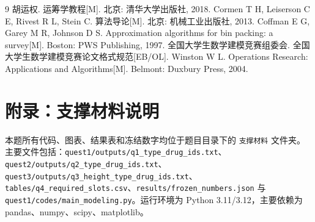 \documentclass[UTF8,a4paper,12pt]{ctexart}
\begin{document}
\begin{thebibliography}{9}
 胡运权. 运筹学教程[M]. 北京: 清华大学出版社, 2018.
 Cormen T H, Leiserson C E, Rivest R L, Stein C. 算法导论[M]. 北京: 机械工业出版社, 2013.
 Coffman E G, Garey M R, Johnson D S. Approximation algorithms for bin packing: a survey[M]. Boston: PWS Publishing, 1997.
 全国大学生数学建模竞赛组委会. 全国大学生数学建模竞赛论文格式规范[EB/OL].
 Winston W L. Operations Research: Applications and Algorithms[M]. Belmont: Duxbury Press, 2004.
\end{thebibliography}

\appendix
\section{附录：支撑材料说明}
本题所有代码、图表、结果表和冻结数字均位于题目目录下的 \texttt{支撑材料} 文件夹。主要文件包括：\texttt{quest1/outputs/q1\_type\_drug\_ids.txt}、\texttt{quest2/outputs/q2\_type\_drug\_ids.txt}、\texttt{quest3/outputs/q3\_height\_type\_drug\_ids.txt}、\texttt{tables/q4\_required\_slots.csv}、\texttt{results/frozen\_numbers.json} 与 \texttt{quest1/codes/main\_modeling.py}。运行环境为 Python 3.11/3.12，主要依赖为 pandas、numpy、scipy、matplotlib。
\end{document}
